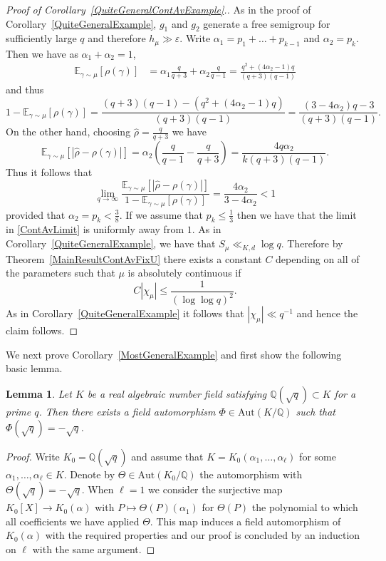 \documentclass[10pt, english,oneside,reqno]{amsart}
\theoremstyle{plain}
\newtheorem{lemma}[theorem]{Lemma}
\theoremstyle{remark}
\numberwithin{equation}{section}
\numberwithin{figure}{section}
\newcommand{\eps}{\varepsilon}
\newcommand{\Q}{\mathbb{Q}}
\newcommand{\E}{\mathbb{E}}
\begin{document}
\begin{proof}[Proof of Corollary~\ref{QuiteGeneralContAvExample}.]
    As in the proof of Corollary~\ref{QuiteGeneralExample}, $g_1$ and $g_2$ generate a free semigroup for sufficiently large $q$ and therefore $h_{\mu} \gg \eps $. Write $\alpha_1 = p_1 + \ldots + p_{k-1}$ and $\alpha_2 = p_k$. Then we have as $\alpha_1 + \alpha_2 = 1$,
    \begin{align*}
        \E_{\gamma\sim\mu}[\rho(\gamma)] &= \alpha_1\frac{q}{q + 3} + \alpha_2\frac{q}{q-1} = \frac{q^2 + (4\alpha_2-1)q}{(q + 3)(q-1)}
    \end{align*} and thus $$1 - \E_{\gamma\sim\mu}[\rho(\gamma)] = \frac{(q + 3)(q-1) - (q^2 + (4\alpha_2-1)q)}{(q + 3)(q-1)} = \frac{(3-4\alpha_2)q - 3}{(q + 3)(q-1)}.$$ On the other hand, choosing $\hat{\rho} = \frac{q}{q + 3}$ we have $$\E_{\gamma\sim\mu}[|\hat{\rho} - \rho(\gamma)|] = \alpha_2 \left( \frac{q}{q-1} - \frac{q}{q + 3} \right) = \frac{4q\alpha_2}{k(q + 3)(q-1)}.$$ Thus it follows that 
    \begin{equation}\label{ContAvLimit}
        \lim_{q \to \infty}  \frac{\E_{\gamma\sim\mu}[|\hat{\rho} - \rho(\gamma)|]}{1 - \E_{\gamma\sim\mu}[\rho(\gamma)]} = \frac{4\alpha_2}{3-4\alpha_2} < 1
    \end{equation}
    provided that $\alpha_2 = p_k < \frac{3}{8}$. If we assume that $p_k \leq \frac{1}{3}$ then we have that the limit in \eqref{ContAvLimit} is uniformly away from $1$. As in Corollary~\ref{QuiteGeneralExample}, we have that $S_{\mu} \ll_{K,d} \log q$.  Therefore by Theorem~\ref{MainResultContAvFixU} there exists a constant $C$ depending on all of the parameters such that $\mu$ is absolutely continuous if $$C|\chi_{\mu}| \leq \frac{1}{(\log \log q)^2}.$$ As in Corollary~\ref{QuiteGeneralExample} it follows that $|\chi_{\mu}| \ll q^{-1}$ and hence the claim follows. 
\end{proof}

We next prove Corollary~\ref{MostGeneralExample} and first show the following basic lemma.

\begin{lemma}\label{BasicGaloisLemma}
    Let $K$ be a real algebraic number field satisfying $\Q(\sqrt{q}) \subset K$ for a prime $q$. Then there exists a field automorphism $\Phi \in \mathrm{Aut}(K/\Q)$ such that $\Phi(\sqrt{q}) = -\sqrt{q}$.
\end{lemma}

\begin{proof}
    Write $K_0 = \Q(\sqrt{q})$ and assume that $K = K_0(\alpha_1, \ldots , \alpha_{\ell})$ for some $\alpha_1, \ldots , \alpha_{\ell} \in K$. Denote by $\Theta \in \mathrm{Aut}(K_0/\Q)$ the automorphism with $\Theta(\sqrt{q}) = -\sqrt{q}$. When $\ell = 1$ we consider the surjective map $K_0[X] \to K_0(\alpha)$ with $P \mapsto \Theta(P)(\alpha_1)$ for $\Theta(P)$ the polynomial to which all coefficients we have applied $\Theta$. This map induces a field automorphism of $K_0(\alpha)$ with the required properties and our proof is concluded by an induction on $\ell$ with the same argument.
\end{proof}
\end{document}
